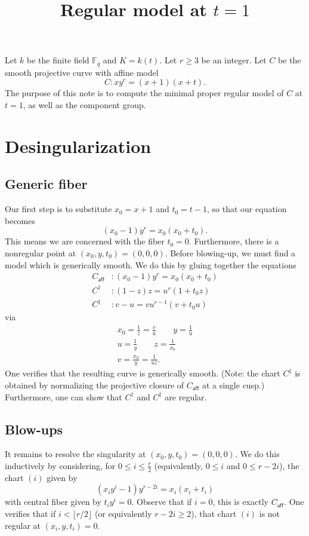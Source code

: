 \documentclass[pagesize,paper=letter]{scrartcl}
\newcommand{\caff}{C_{\textsf{aff}}}
\theoremstyle{plain}
\theoremstyle{definition}
\theoremstyle{remark}
\newcommand{\F}{\ensuremath{\mathbb{F}}}
\begin{document}
\title{Regular model at $t=1$}
\maketitle

Let $k$ be the finite field $\F_q$ and $K = k(t)$. Let $r \geq 3$ be an integer. Let $C$ be the smooth projective curve with affine model
\[
C: xy^r = (x+1)(x+t).
\]
The purpose of this note is to compute the minimal proper regular model of $C$ at $t = 1$, as well as the component group.

\section{Desingularization}
\label{sec:desingularization}

\subsection{Generic fiber}
\label{sec:generic-fiber}

Our first step is to substitute $x_0 = x+1$ and $t_0 = t-1$, so that our equation becomes
\[
(x_0 - 1) y^r = x_0(x_0 + t_0).
\]
This means we are concerned with the fiber $t_0 = 0$. Furthermore, there is a nonregular point at $(x_0, y, t_0) = (0, 0, 0)$. Before blowing-up, we must find a model which is generically smooth. We do this by gluing together the equations
\begin{align*}
  \caff&: (x_0 - 1) y^r = x_0(x_0 + t_0)\\
  C^\dagger&: (1-z)z = u^r(1+t_0z) \\
  C^\ddag&: v-u = vu^{r-1}(v + t_0 u)
\end{align*}
via
\begin{gather*}
  x_0 = \frac{1}{z} = \frac{v}{u} \qquad y = \frac{1}{u} \\
  u = \frac{1}{y} \qquad z = \frac{1}{x_0} \\
  v = \frac{x_0}{y} = \frac{1}{uz}.
\end{gather*}
One verifies that the resulting curve is generically smooth. (Note: the chart $C^\ddag$ is obtained by normalizing the projective closure of $\caff$ at a single cusp.) Furthermore, one can show that $C^\dag$ and $C^\ddag$ are regular.

\subsection{Blow-ups}
\label{sec:blow-ups}

It remains to resolve the singularity at $(x_0, y, t_0) = (0, 0, 0)$. We do this inductively by considering, for $0 \leq i \leq \frac{r}{2}$ (equivalently, $0 \leq i$ and $0 \leq r - 2i$), the chart $(i)$ given by
\[
(x_iy^i - 1) y^{r-2i} = x_i(x_i + t_i)
\]
with central fiber given by $t_iy^i = 0$. Observe that if $i = 0$, this is exactly $\caff$. One verifies that if $i < \lfloor r/2 \rfloor$ (or equivalently $r - 2i \geq 2$), that chart $(i)$ is not regular at $(x_i, y, t_i) = 0$. 



\end{document}
